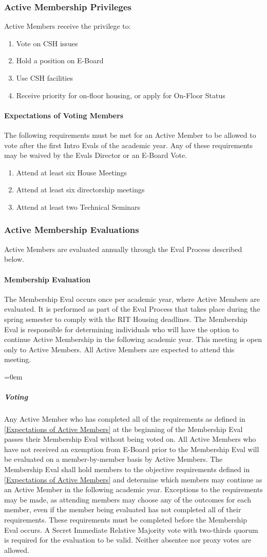 \documentclass{article}
\newcommand{\asubsection}[1]{\subsubsection{#1} \label{#1}}
\newcommand{\asubsubsection}[1]{\paragraph{#1} \label{#1}}
\newcommand{\asubsubsubsection}[1]{\parindent=0em\subparagraph{#1} \label{#1}}
\begin{document}
\asubsection{Active Membership Privileges}
Active Members receive the privilege to:
\begin{enumerate}
	\item Vote on CSH issues
	\item Hold a position on E-Board
	\item Use CSH facilities
	\item Receive priority for on-floor housing, or apply for On-Floor Status
\end{enumerate}

\asubsubsection{Expectations of Voting Members}
\renewcommand{\theenumi}{\arabic{enumi}} %

The following requirements must be met for an Active Member to be allowed to vote after the first Intro Evals of the academic year.
Any of these requirements may be waived by the Evals Director or an E-Board Vote.
\begin{enumerate}
	\item Attend at least six House Meetings
	\item Attend at least six directorship meetings
	\item Attend at least two Technical Seminars
\end{enumerate}

\asubsection{Active Membership Evaluations}
Active Members are evaluated annually through the Eval Process described below.

\asubsubsection{Membership Evaluation}
The Membership Eval occurs once per academic year, where Active Members are evaluated.
It is performed as part of the Eval Process that takes place during the spring semester to comply with the RIT Housing deadlines.
The Membership Eval is responsible for determining individuals who will have the option to continue Active Membership in the following academic year.
This meeting is open only to Active Members.
All Active Members are expected to attend this meeting.

\asubsubsubsection{Voting}
Any Active Member who has completed all of the requirements as defined in \ref{Expectations of Active Members} at the beginning of the Membership Eval passes their Membership Eval without being voted on.
All Active Members who have not received an exemption from E-Board prior to the Membership Eval will be evaluated on a member-by-member basis by Active Members.
The Membership Eval shall hold members to the objective requirements defined in \ref{Expectations of Active Members} and determine which members may continue as an Active Member in the following academic year.
Exceptions to the requirements may be made, as attending members may choose any of the outcomes for each member, even if the member being evaluated has not completed all of their requirements.
These requirements must be completed before the Membership Eval occurs.
A Secret Immediate Relative Majority vote with two-thirds quorum is required for the evaluation to be valid.
Neither absentee nor proxy votes are allowed.
\end{document}
